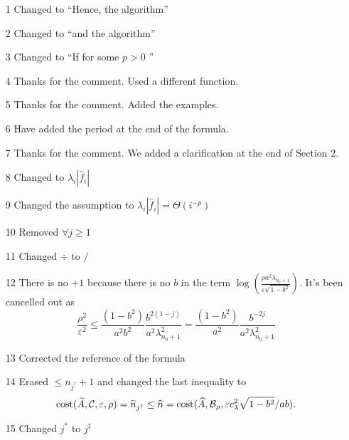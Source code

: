 \documentclass[letter]{article}
\begin{document}
\begin{enumerate}
    \item[1] Changed to ``Hence, the algorithm''
    \item[2] Changed to ``and the algorithm''
    \item[3] Changed to ``If for some $p > 0$ ''
    \item[4] Thanks for the comment. Used a different function.
    \item[5] Thanks for the comment. Added the examples.
    \item[6] Have added the period at the end of the formula.
    \item[7] Thanks for the comment. We added a clarification at the end of Section 2.
    \item[8] Changed to $\lambda_i |\widehat{f}_i|$
    \item[9] Changed the assumption to 
    $\lambda_i |\widehat{f}_i| =\Theta(i^{-p})$
    \item[10] Removed $\forall j  \ge 1$
    \item[11] Changed $\div$ to $/$
    \item[12] There is no $+1$ because there is no $b$ in the term
    $ \log\left(\frac{\rho a^2\lambda_{n_{0}+1} }{\varepsilon \sqrt{1 - b^2}}\right)$.
    It's been cancelled out as
    \[\frac{\rho^2}{\varepsilon^2} \le \frac{(1 - b^2)}{a^2b^2} \frac{b^{2(1-j)}}{a^2\lambda_{n_{0}+1}^2} =  \frac{(1 - b^2)}{a^2} \frac{b^{-2j}}{a^2\lambda_{n_{0}+1}^2}\]
    \item[13] Corrected the reference of the formula
    \item[14] Erased $\le n_{j^\dagger}+1$ and changed the last inequality to
    \[
    \textup{cost}(\widetilde{A},{\mathcal{C}},\varepsilon,\rho) = \widetilde{n}_{j^\dagger} \le  \widehat{n} = \textup{cost}(\widehat{A},{\mathcal{B}}_{\rho},\varepsilon c_{\lambda}^2\sqrt{1 - b^2}/ab).
    \]
    \item[15] Changed $j^*$ to $j^{\ddagger}$
\end{enumerate}
\end{document}
